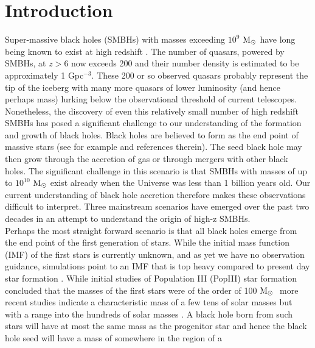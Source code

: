 \documentclass[graphics, twocolumn, usenatbib]{mn2e}
\newcommand{\msolar} {$\rm{M_{\odot}}~$}
\begin{document}
\section{Introduction} \label{Sec:Introduction}
Super-massive black holes (SMBHs) with masses exceeding $10^{9}$ \msolar have long being known to
exist at high redshift \citep[e.g.][]{Fan_2001, Dietrich_2002, Fan_2003, Vestergaard_2004,
  Fan_2004, Fan_06}.
The number of quasars, powered by SMBHs, at $z > 6$ now exceeds 200 and their number
density is estimated to be approximately 1 Gpc$^{-3}$. These 200 or so observed quasars probably
represent the tip of the iceberg with many more quasars of lower luminosity (and hence perhaps mass)
lurking below the observational threshold of current telescopes. \\
\indent Nonetheless, the discovery of even this relatively small number of high redshift SMBHs
has posed a significant challenge to our understanding of the formation and growth of black holes.
Black holes are believed to form as the end point of massive stars (see for example
\cite{Volonteri_2010a} and references therein). The seed black hole may then grow through the
accretion of gas or through mergers with other black holes. The significant challenge in this
scenario is that SMBHs with masses of up to $10^{10}$ \msolar exist \citep{Wu_2015} already when
the Universe was less than 1 billion years old. Our current understanding of black hole accretion
therefore makes these observations difficult to interpret. Three mainstream scenarios have
emerged over the past two decades in an attempt to understand the origin of high-z SMBHs. \\
\indent Perhaps the most straight forward scenario is that all black holes emerge from the end
point of the first generation of stars. While the initial mass function (IMF) of the first stars
is currently unknown, and as yet we have no observation guidance, simulations point to an IMF that
is top heavy compared to present day star formation \citep{Yoshida_2006, Turk_2009,
  Clark_2011a, Hirano_2014}. While initial studies of Population III (PopIII) star formation
concluded that the masses of the first stars were of the order of 100 \msolar \citep{Bromm_1999,
  Abel_2002, Bromm_2002} more recent studies indicate a characteristic mass of a few tens of solar
masses but with a range into the hundreds of solar masses \citep{Stacy_2010, Stacy_2012, Stacy_2014,
  Hirano_2014}. A black hole born from such stars will have at most the same mass as the
progenitor star and hence the black hole seed will have a mass of somewhere in the region of a
\end{document}
